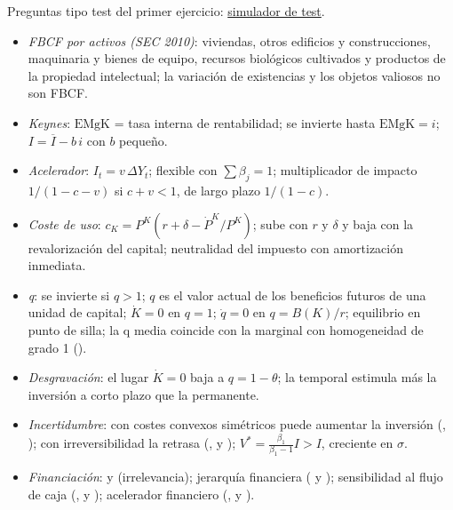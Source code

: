 \documentclass[11pt]{article}
\begin{document}
\begin{anotaciones}
Preguntas tipo test del primer ejercicio: \href{https://www.victorgutierrezmarcos.es/oposicion/temario/primer-ejercicio/test/simulador.html?tema=3.A.34}{simulador de test}.
\end{anotaciones}

\begin{itemize}
\item \emph{FBCF por activos (SEC 2010)}: viviendas, otros edificios y construcciones, maquinaria y bienes de equipo, recursos biológicos cultivados y productos de la propiedad intelectual; la variación de existencias y los objetos valiosos no son FBCF\nocite{RegUE2013SEC2010}.
\item \emph{Keynes}: $\mathrm{EMgK}$ = tasa interna de rentabilidad; se invierte hasta $\mathrm{EMgK}=i$; $I=\overline{I}-b\,i$ con $b$ pequeño.
\item \emph{Acelerador}: $I_t=v\,\Delta Y_t$; flexible con $\sum\beta_j=1$; multiplicador de impacto $1/(1-c-v)$ si $c+v<1$, de largo plazo $1/(1-c)$.
\item \emph{Coste de uso}: $c_K=P^K(r+\delta-\dot P^K/P^K)$; sube con $r$ y $\delta$ y baja con la revalorización del capital; neutralidad del impuesto con amortización inmediata.
\item \emph{q}: se invierte si $q>1$; $q$ es el valor actual de los beneficios futuros de una unidad de capital; $\dot K=0$ en $q=1$; $\dot q=0$ en $q=B(K)/r$; equilibrio en punto de silla; la q media coincide con la marginal con homogeneidad de grado 1 ().
\item \emph{Desgravación}: el lugar $\dot K=0$ baja a $q=1-\theta$; la temporal estimula más la inversión a corto plazo que la permanente.
\item \emph{Incertidumbre}: con costes convexos simétricos puede aumentar la inversión (, ); con irreversibilidad la retrasa (,  y ); $V^*=\frac{\beta_1}{\beta_1-1}I>I$, creciente en $\sigma$.
\item \emph{Financiación}:  y  (irrelevancia); jerarquía financiera ( y ); sensibilidad al flujo de caja (,  y ); acelerador financiero (,  y ).
\end{itemize}

\bibliografia
\end{document}
